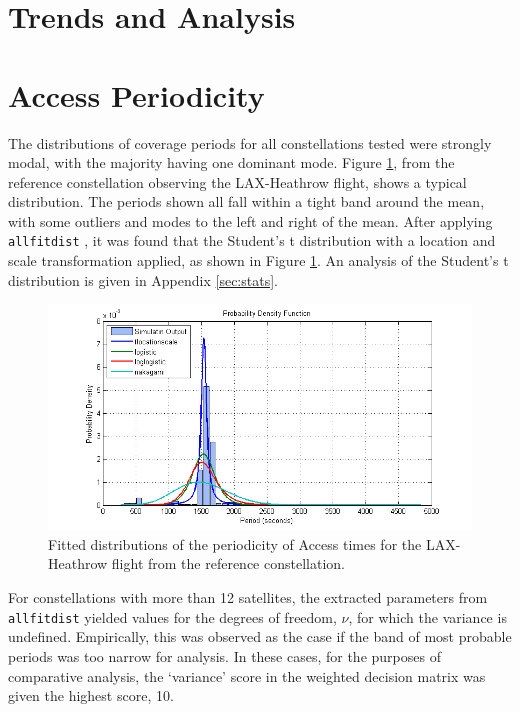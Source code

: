 \section{Trends and Analysis}





\section{Access Periodicity} \label{sec:periodicity_stats}
The distributions of coverage periods for all constellations tested were strongly modal, with the majority having one dominant mode. Figure \ref{fig:allfitdist_Heathrow}, from the reference constellation observing the LAX-Heathrow flight, shows a typical distribution. The periods shown all fall within a tight band around the mean, with some outliers and modes to the left and right of the mean. After applying \verb|allfitdist| \cite{sheppard12}, it was found that the Student's t distribution with a location and scale transformation applied, as shown in Figure \ref{fig:allfitdist_Heathrow}. An analysis of the Student's t distribution is given in Appendix \ref{sec:stats}.

\begin{figure}[htbp]
	\centering
	\includegraphics[scale = 0.85]{Pictures/allfitdist_Heathrow.png}
	
	\caption{Fitted distributions of the periodicity of Access times for the LAX-Heathrow flight from the reference constellation. }
	\label{fig:allfitdist_Heathrow}
\end{figure} 
For constellations with more than 12 satellites, the extracted parameters from \verb|allfitdist| yielded values for the degrees of freedom, $\nu$, for which the variance is undefined. Empirically, this was observed as the case if the band of most probable periods was too narrow for analysis. In these cases, for the purposes of comparative analysis, the `variance' score in the weighted decision matrix was given the highest score, 10.

